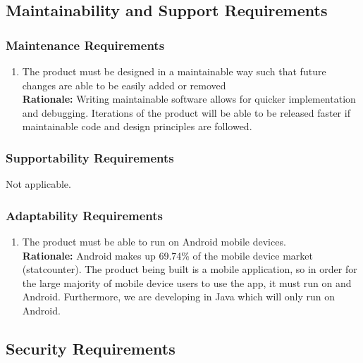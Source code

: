 \documentclass[]{article}
\begin{document}

\subsection{Maintainability and Support Requirements}
\label{sub:maintainability_and_support_requirements}

\subsubsection{Maintenance Requirements}
\label{ssub:maintenance_requirements}
\begin{enumerate}[{MS-M}1. ]
	\item The product must be designed in a maintainable way such that future changes are able to be easily added or removed \\
	{\bf Rationale:} Writing maintainable software allows for quicker implementation and debugging. Iterations of the product will be able to be released faster if maintainable code and design principles are followed.
\end{enumerate}

\subsubsection{Supportability Requirements}
\label{ssub:supportability_requirements}
Not applicable.

\subsubsection{Adaptability Requirements}
\label{ssub:adaptability_requirements}
\begin{enumerate}[{MS-A}1. ]
	\item The product must be able to run on Android mobile devices. \\
	{\bf Rationale:} Android makes up 69.74\% of the mobile device market (statcounter). The product being built is a mobile application, so in order for the large majority of mobile device users to use the app, it must run on and Android. Furthermore, we are developing in Java which will only run on Android.
\end{enumerate}


\subsection{Security Requirements}
\label{sub:security_requirements}
\end{document}
